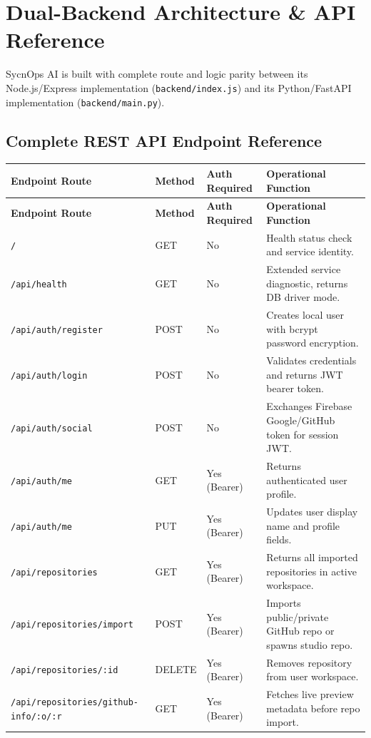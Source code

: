 \documentclass[11pt,a4paper]{article}
\begin{document}
\section{Dual-Backend Architecture \& API Reference}

SycnOps AI is built with complete route and logic parity between its Node.js/Express implementation (\texttt{backend/index.js}) and its Python/FastAPI implementation (\texttt{backend/main.py}).

\subsection{Complete REST API Endpoint Reference}

\begin{longtable}{p{4.2cm} l p{2.2cm} X}
\toprule
\textbf{Endpoint Route} & \textbf{Method} & \textbf{Auth Required} & \textbf{Operational Function} \\
\midrule
\endfirsthead
\toprule
\textbf{Endpoint Route} & \textbf{Method} & \textbf{Auth Required} & \textbf{Operational Function} \\
\midrule
\endhead
\texttt{/} & GET & No & Health status check and service identity. \\
\texttt{/api/health} & GET & No & Extended service diagnostic, returns DB driver mode. \\
\texttt{/api/auth/register} & POST & No & Creates local user with bcrypt password encryption. \\
\texttt{/api/auth/login} & POST & No & Validates credentials and returns JWT bearer token. \\
\texttt{/api/auth/social} & POST & No & Exchanges Firebase Google/GitHub token for session JWT. \\
\texttt{/api/auth/me} & GET & Yes (Bearer) & Returns authenticated user profile. \\
\texttt{/api/auth/me} & PUT & Yes (Bearer) & Updates user display name and profile fields. \\
\texttt{/api/repositories} & GET & Yes (Bearer) & Returns all imported repositories in active workspace. \\
\texttt{/api/repositories/import} & POST & Yes (Bearer) & Imports public/private GitHub repo or spawns studio repo. \\
\texttt{/api/repositories/:id} & DELETE & Yes (Bearer) & Removes repository from user workspace. \\
\texttt{/api/repositories/github-info/:o/:r} & GET & Yes (Bearer) & Fetches live preview metadata before repo import. \\

\end{longtable}
\end{document}
